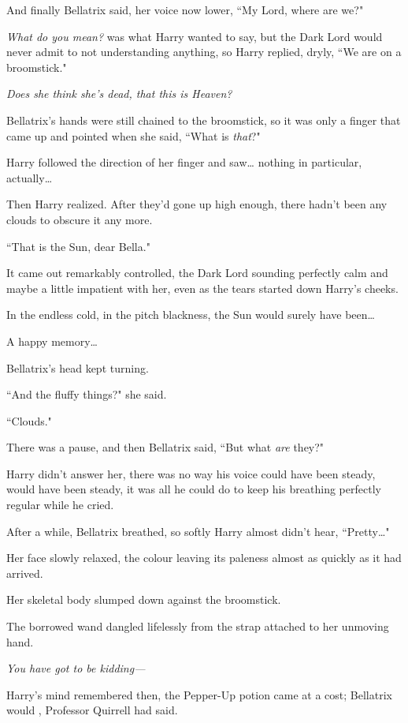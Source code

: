 And finally Bellatrix said, her voice now lower, ``My Lord, where are we?"

\emph{What do you mean?} was what Harry wanted to say, but the Dark Lord would never admit to not understanding anything, so Harry replied, dryly, ``We are on a broomstick."

\emph{Does she think she's dead, that this is Heaven?}

Bellatrix's hands were still chained to the broomstick, so it was only a finger that came up and pointed when she said, ``What is \emph{that}?"

Harry followed the direction of her finger and saw{\ldots} nothing in particular, actually{\ldots}

Then Harry realized. After they'd gone up high enough, there hadn't been any clouds to obscure it any more.

``That is the Sun, dear Bella."

It came out remarkably controlled, the Dark Lord sounding perfectly calm and maybe a little impatient with her, even as the tears started down Harry's cheeks.

In the endless cold, in the pitch blackness, the Sun would surely have been{\ldots}

A happy memory{\ldots}

Bellatrix's head kept turning.

``And the fluffy things?" she said.

``Clouds."

There was a pause, and then Bellatrix said, ``But what \emph{are} they?"

Harry didn't answer her, there was no way his voice could have been steady, would have been steady, it was all he could do to keep his breathing perfectly regular while he cried.

After a while, Bellatrix breathed, so softly Harry almost didn't hear, ``Pretty{\ldots}"

Her face slowly relaxed, the colour leaving its paleness almost as quickly as it had arrived.

Her skeletal body slumped down against the broomstick.

The borrowed wand dangled lifelessly from the strap attached to her unmoving hand.

\emph{You have \emph{got} to be \emph{kidding}—}

Harry's mind remembered then, the Pepper-Up potion came at a cost; Bellatrix would , Professor Quirrell had said.

